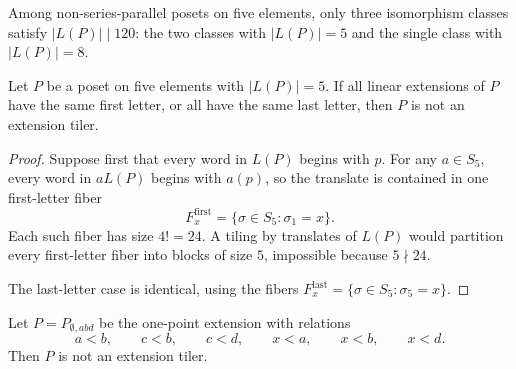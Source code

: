 \begin{corollary}
\label{cor:s5-divisibility-reduction}
Among non-series-parallel posets on five elements, only three isomorphism
classes satisfy $|L(P)|\mid 120$: the two classes with $|L(P)|=5$ and the
single class with $|L(P)|=8$.
\end{corollary}

\begin{lemma}
\label{lem:fixed-position-obstruction}
Let $P$ be a poset on five elements with $|L(P)|=5$.  If all linear
extensions of $P$ have the same first letter, or all have the same last
letter, then $P$ is not an extension tiler.
\end{lemma}

\begin{proof}
Suppose first that every word in $L(P)$ begins with $p$.  For any
$a\in S_5$, every word in $aL(P)$ begins with $a(p)$, so the translate is
contained in one first-letter fiber
\[
        F_x^{\mathrm{first}}=\{\sigma\in S_5:\sigma_1=x\}.
\]
Each such fiber has size $4!=24$.  A tiling by translates of $L(P)$ would
partition every first-letter fiber into blocks of size $5$, impossible
because $5\nmid 24$.

The last-letter case is identical, using the fibers
$F_x^{\mathrm{last}}=\{\sigma\in S_5:\sigma_5=x\}$.
\end{proof}

\begin{lemma}
\label{lem:two-letter-obstruction}
Let $P=P_{\emptyset,abd}$ be the one-point extension with relations
\[
        a<b,\qquad c<b,\qquad c<d,\qquad x<a,\qquad x<b,\qquad x<d.
\]
Then $P$ is not an extension tiler.
\end{lemma}

